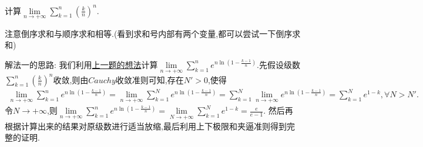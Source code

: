 \documentclass[../../main.tex]{subfiles}%
\begin{document}
\begin{example}
计算$\underset{n\rightarrow +\infty}{\lim}\sum\limits_{k=1}^n{\left( \frac{k}{n} \right) ^n}$.
\end{example}
\begin{remark}
注意倒序求和与顺序求和相等.(看到求和号内部有两个变量,都可以尝试一下倒序求和)
\end{remark}
\begin{note}
{\color{blue}解法一}的思路:
我们利用\hyperref[计算二元数列求和的极限的思路]{上一题的想法}计算$\underset{n\rightarrow +\infty}{\lim}\sum\limits_{k=1}^n{e^{n\ln \left( 1-\frac{k-1}{n} \right)}}$.先假设级数$\sum\limits_{k=1}^n{\left( \frac{k}{n} \right) ^n}$收敛,则由$Cauchy$收敛准则可知,存在$N'>0$,使得
\begin{align*}
\underset{n\rightarrow +\infty}{\lim}\sum\limits_{k=1}^n{e^{n\ln \left( 1-\frac{k-1}{n} \right)}}=\underset{n\rightarrow +\infty}{\lim}\sum\limits_{k=1}^N{e^{n\ln \left( 1-\frac{k-1}{n} \right)}}=\sum\limits_{k=1}^N{\underset{n\rightarrow +\infty}{\lim}e^{n\ln \left( 1-\frac{k-1}{n} \right)}=\sum\limits_{k=1}^N{e^{1-k}},\forall N>N'}.
\end{align*}
令$N\to +\infty$,则$\underset{n\rightarrow +\infty}{\lim}\sum\limits_{k=1}^n{e^{n\ln \left( 1-\frac{k-1}{n} \right)}}=\underset{N\rightarrow +\infty}{\lim}\sum\limits_{k=1}^N{e^{1-k}}=\frac{e}{e-1}$.
然后再根据计算出来的结果对原级数进行适当放缩,最后利用上下极限和夹逼准则得到完整的证明.
\end{note}
\end{document}
